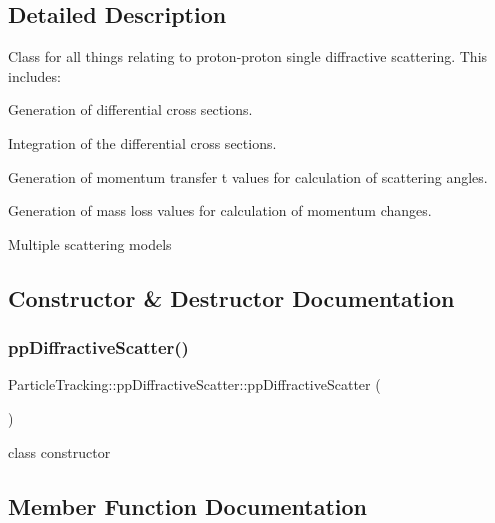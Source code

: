\subsection{Detailed Description}
Class for all things relating to proton-\/proton single diffractive scattering. This includes\+:
\begin{DoxyItemize}
\item Generation of differential cross sections.
\item Integration of the differential cross sections.
\item Generation of momentum transfer t values for calculation of scattering angles.
\item Generation of mass loss values for calculation of momentum changes.
\item Multiple scattering models 
\end{DoxyItemize}

\subsection{Constructor \& Destructor Documentation}
\mbox{\label{classParticleTracking_1_1ppDiffractiveScatter_a1127d26a2b1b95632ed823ef803a855b}} 
\subsubsection{\texorpdfstring{pp\+Diffractive\+Scatter()}{ppDiffractiveScatter()}}
{\footnotesize\ttfamily Particle\+Tracking\+::pp\+Diffractive\+Scatter\+::pp\+Diffractive\+Scatter (\begin{DoxyParamCaption}{ }\end{DoxyParamCaption})\hspace{0.3cm}{\ttfamily [inline]}}

class constructor 

\subsection{Member Function Documentation}
\mbox{\label{classParticleTracking_1_1ppDiffractiveScatter_a206970eeedffc495ff7558fd5078b2a0}} 
